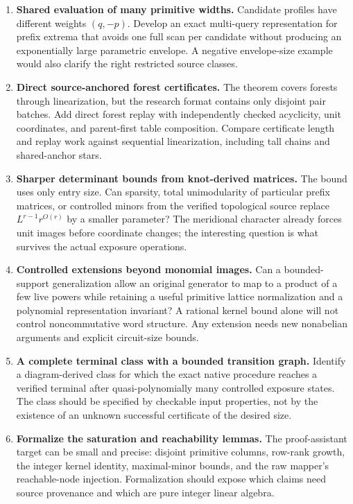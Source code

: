 \documentclass[11pt,letterpaper]{article}
\theoremstyle{definition}
\theoremstyle{remark}\newtheorem{remark}[theorem]{Remark}
\begin{document}
\begin{enumerate}[label=\textbf{Q\arabic*.},leftmargin=2.6em]
\item \textbf{Shared evaluation of many primitive widths.}
Candidate profiles have different weights $(q,-p)$. Develop an exact
multi-query representation for prefix extrema that avoids one full scan per
candidate without producing an exponentially large parametric envelope.
A negative envelope-size example would also clarify the right restricted
source classes.

\item \textbf{Direct source-anchored forest certificates.}
The theorem covers forests through linearization, but the research format
contains only disjoint pair batches. Add direct forest replay with independently
checked acyclicity, unit coordinates, and parent-first table composition.
Compare certificate length and replay work against sequential linearization,
including tall chains and shared-anchor stars.

\item \textbf{Sharper determinant bounds from knot-derived matrices.}
The bound uses only entry size. Can sparsity, total unimodularity of particular
prefix matrices, or controlled minors from the verified topological source
replace $L^{r-1}r^{O(r)}$ by a smaller parameter? The meridional character
already forces unit images before coordinate changes; the interesting question
is what survives the actual exposure operations.

\item \textbf{Controlled extensions beyond monomial images.}
Can a bounded-support generalization allow an original generator to map to a
product of a few live powers while retaining a useful primitive lattice
normalization and a polynomial representation invariant? A rational kernel
bound alone will not control noncommutative word structure. Any extension
needs new nonabelian arguments and explicit circuit-size bounds.

\item \textbf{A complete terminal class with a bounded transition graph.}
Identify a diagram-derived class for which the exact native procedure reaches
a verified terminal after quasi-polynomially many controlled exposure states.
The class should be specified by checkable input properties, not by the
existence of an unknown successful certificate of the desired size.

\item \textbf{Formalize the saturation and reachability lemmas.}
The proof-assistant target can be small and precise: disjoint primitive
columns, row-rank growth, the integer kernel identity, maximal-minor bounds,
and the raw mapper's reachable-node injection. Formalization should expose
which claims need source provenance and which are pure integer linear algebra.


\end{enumerate}
\end{document}
